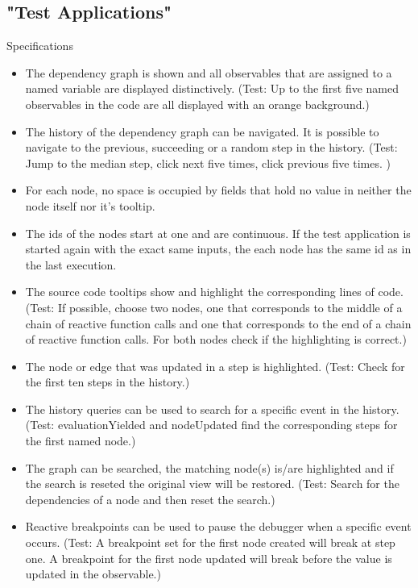 	\subsection{"Test Applications"}
	Specifications
	\begin{itemize}
		\item The dependency graph is shown and all observables that are assigned to a named variable are displayed distinctively.
		(Test: Up to the first five named observables in the code are all displayed with an orange background.)
		\item The history of the dependency graph can be navigated. It is possible to navigate to the previous, succeeding or a random step in the history. (Test: Jump to the median step, click next five times, click previous five times. )
		\item For each node, no space is occupied by fields that hold no value in neither the node itself nor it's tooltip.
		\item The ids of the nodes start at one and are continuous. If the test application is started again with the exact same inputs, the each node has the same id as in the last execution.
		\item The source code tooltips show and highlight the corresponding lines of code. (Test: If possible, choose two nodes, one that corresponds to the middle of a chain of reactive function calls and one that corresponds to the end of a chain of reactive function calls. For both nodes check if the highlighting is correct.)
		\item The node or edge that was updated in a step is highlighted. (Test: Check for the first ten steps in the history.)
		\item The history queries can be used to search for a specific event in the history. (Test: evaluationYielded and nodeUpdated find the corresponding steps for the first named node.)
		\item The graph can be searched, the matching node(s) is/are highlighted and if the search is reseted the original view will be restored. (Test: Search for the dependencies of a node and then reset the search.)
		\item Reactive breakpoints can be used to pause the debugger when a specific event occurs. (Test: A breakpoint set for the first node created will break at step one. A breakpoint for the first node updated will break before the value is updated in the observable.)
	\end{itemize}
	
